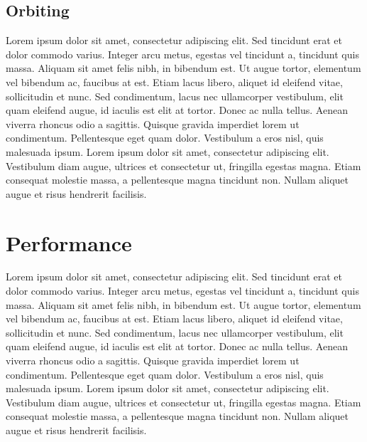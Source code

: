 \documentclass[letterpaper, 10 pt, conference]{ieeeconf}
\begin{document}
\subsection{Orbiting}
Lorem ipsum dolor sit amet, consectetur adipiscing elit. Sed tincidunt erat et dolor commodo varius. Integer arcu metus, egestas vel tincidunt a, tincidunt quis massa. Aliquam sit amet felis nibh, in bibendum est. Ut augue tortor, elementum vel bibendum ac, faucibus at est. Etiam lacus libero, aliquet id eleifend vitae, sollicitudin et nunc. Sed condimentum, lacus nec ullamcorper vestibulum, elit quam eleifend augue, id iaculis est elit at tortor. Donec ac nulla tellus. Aenean viverra rhoncus odio a sagittis. Quisque gravida imperdiet lorem ut condimentum. Pellentesque eget quam dolor. Vestibulum a eros nisl, quis malesuada ipsum. Lorem ipsum dolor sit amet, consectetur adipiscing elit. Vestibulum diam augue, ultrices et consectetur ut, fringilla egestas magna. Etiam consequat molestie massa, a pellentesque magna tincidunt non. Nullam aliquet augue et risus hendrerit facilisis.


\section{Performance}
Lorem ipsum dolor sit amet, consectetur adipiscing elit. Sed tincidunt erat et dolor commodo varius. Integer arcu metus, egestas vel tincidunt a, tincidunt quis massa. Aliquam sit amet felis nibh, in bibendum est. Ut augue tortor, elementum vel bibendum ac, faucibus at est. Etiam lacus libero, aliquet id eleifend vitae, sollicitudin et nunc. Sed condimentum, lacus nec ullamcorper vestibulum, elit quam eleifend augue, id iaculis est elit at tortor. Donec ac nulla tellus. Aenean viverra rhoncus odio a sagittis. Quisque gravida imperdiet lorem ut condimentum. Pellentesque eget quam dolor. Vestibulum a eros nisl, quis malesuada ipsum. Lorem ipsum dolor sit amet, consectetur adipiscing elit. Vestibulum diam augue, ultrices et consectetur ut, fringilla egestas magna. Etiam consequat molestie massa, a pellentesque magna tincidunt non. Nullam aliquet augue et risus hendrerit facilisis.

\end{document}
